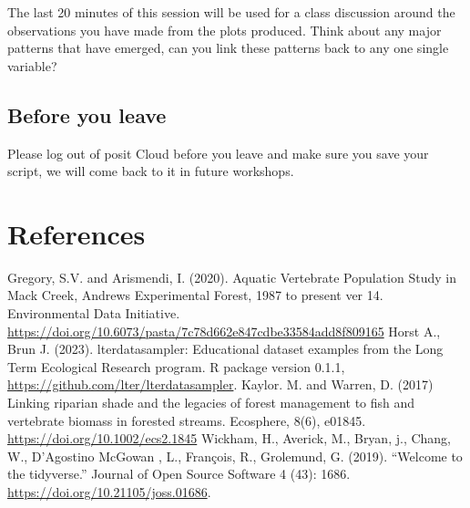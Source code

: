 \documentclass[
]{book}
\begin{document}
The last 20 minutes of this session will be used for a class discussion around the observations you have made from the plots produced. Think about any major patterns that have emerged, can you link these patterns back to any one single variable?

\hypertarget{before-you-leave}{%
\section{Before you leave}\label{before-you-leave}}

Please log out of posit Cloud before you leave and make sure you save your script, we will come back to it in future workshops.

\hypertarget{references}{%
\chapter{References}\label{references}}

Gregory, S.V. and Arismendi, I. (2020). Aquatic Vertebrate Population Study in Mack Creek, Andrews Experimental Forest, 1987 to present ver 14. Environmental Data Initiative. \url{https://doi.org/10.6073/pasta/7c78d662e847cdbe33584add8f809165}
Horst A., Brun J. (2023). lterdatasampler: Educational dataset examples from the Long Term Ecological Research program. R package version 0.1.1, \url{https://github.com/lter/lterdatasampler}.
Kaylor. M. and Warren, D. (2017) Linking riparian shade and the legacies of forest management to fish and vertebrate biomass in forested streams. Ecosphere, 8(6), e01845. \url{https://doi.org/10.1002/ecs2.1845}
Wickham, H., Averick, M., Bryan, j., Chang, W., D'Agostino McGowan , L., François, R., Grolemund, G. (2019). ``Welcome to the tidyverse.'' Journal of Open Source Software 4 (43): 1686. \url{https://doi.org/10.21105/joss.01686}.
\end{document}
